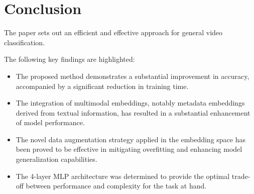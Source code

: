 \section{Conclusion}


The paper sets out an efficient and effective approach for general video classification.

The following key findings are highlighted:


\begin{itemize}
    \item The proposed method demonstrates a substantial improvement in accuracy, accompanied by a significant reduction in training time.
    \item The integration of multimodal embeddings, notably metadata embeddings derived from textual information, has resulted in a substantial enhancement of model performance.
    \item The novel data augmentation strategy applied in the embedding space has been proved to be effective in mitigating overfitting and enhancing model generalization capabilities.
    \item The 4-layer MLP architecture was determined to provide the optimal trade-off between performance and complexity for the task at hand.
\end{itemize}


